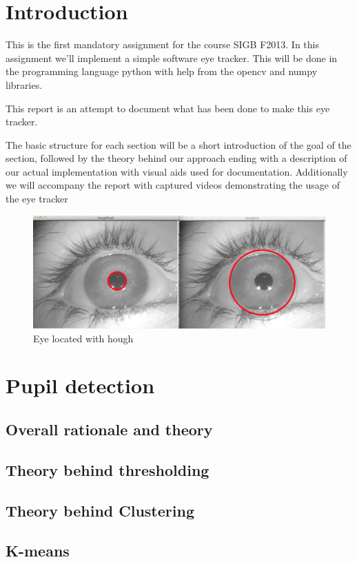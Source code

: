 \section{Introduction}

This is the first mandatory assignment for the course SIGB F2013. In
this assignment we'll implement a simple software eye tracker. This will
be done in the programming language python with help from the opencv and
numpy libraries.

This report is an attempt to document what has been done to make this
eye tracker.

The basic structure for each section will be a short introduction of the
goal of the section, followed by the theory behind our approach ending
with a description of our actual implementation with visual aids used
for documentation. Additionally we will accompany the report with
captured videos demonstrating the usage of the eye tracker

\begin{figure}[htbp]
\centering
\includegraphics{pics/houghtransform.png}
\caption{Eye located with hough}
\end{figure}

\section{Pupil detection}

\subsection{Overall rationale and theory}

\subsection{Theory behind thresholding}

\subsection{Theory behind Clustering}

\subsection{K-means}

